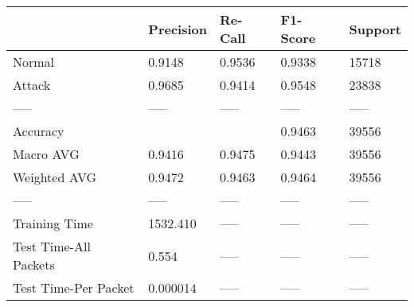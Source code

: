 \begin{tabular}{lllll}
\toprule
{} & Precision & Re-Call & F1-Score & Support \\
\midrule
Normal                &    0.9148 &  0.9536 &   0.9338 &   15718 \\
Attack                &    0.9685 &  0.9414 &   0.9548 &   23838 \\
-----                 &     ----- &   ----- &    ----- &   ----- \\
Accuracy              &           &         &   0.9463 &   39556 \\
Macro AVG             &    0.9416 &  0.9475 &   0.9443 &   39556 \\
Weighted AVG          &    0.9472 &  0.9463 &   0.9464 &   39556 \\
-----                 &     ----- &   ----- &    ----- &   ----- \\
Training Time         &  1532.410 &   ----- &    ----- &   ----- \\
Test Time-All Packets &     0.554 &   ----- &    ----- &   ----- \\
Test Time-Per Packet  &  0.000014 &   ----- &    ----- &   ----- \\
\bottomrule
\end{tabular}
